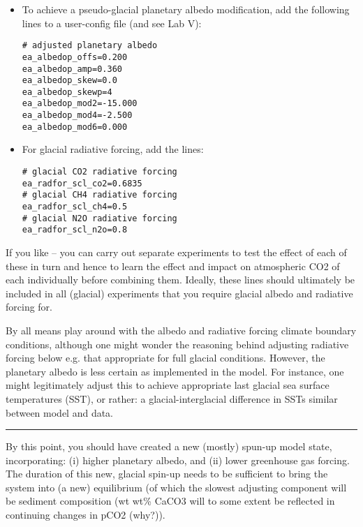 \documentclass[11pt,fleqn]{book} %
\begin{document}
\begin{itemize}[noitemsep]

\item To achieve a pseudo-glacial planetary albedo modification, add the following lines to a
user-config file (and see Lab V):
\vspace{-1mm}\begin{verbatim}
# adjusted planetary albedo
ea_albedop_offs=0.200
ea_albedop_amp=0.360
ea_albedop_skew=0.0
ea_albedop_skewp=4
ea_albedop_mod2=-15.000
ea_albedop_mod4=-2.500
ea_albedop_mod6=0.000
\end{verbatim}\vspace{-1mm}

\item For glacial radiative forcing, add the lines:
\vspace{-1mm}\begin{verbatim}
# glacial CO2 radiative forcing
ea_radfor_scl_co2=0.6835
# glacial CH4 radiative forcing
ea_radfor_scl_ch4=0.5
# glacial N2O radiative forcing
ea_radfor_scl_n2o=0.8
\end{verbatim}\vspace{-1mm}

\end{itemize}

If you like – you can carry out separate experiments to test the effect of each of these in turn and
hence to learn the effect and impact on atmospheric CO2 of each individually before combining
them. Ideally, these lines should ultimately be included in all (glacial) experiments that you require
glacial albedo and radiative forcing for.

By all means play around with the albedo and radiative forcing climate boundary conditions,
although one might wonder the reasoning behind adjusting radiative forcing below e.g. that
appropriate for full glacial conditions. However, the planetary albedo is less certain as implemented
in the model. For instance, one might legitimately adjust this to achieve appropriate last glacial sea
surface temperatures (SST), or rather: a glacial-interglacial difference in SSTs similar between
model and data.

\vspace{1mm}
\noindent\rule{4cm}{0.5pt}
\vspace{2mm}

By this point, you should have created a new (mostly) spun-up model state, incorporating: (i)
higher planetary albedo, and (ii) lower greenhouse gas forcing. The duration of this new, glacial
spin-up needs to be sufficient to bring the system into (a new) equilibrium (of which the slowest
adjusting component will be sediment composition (wt%
wt\% CaCO3 will to some extent be reflected in continuing changes in pCO2 (why?)).
\end{document}
